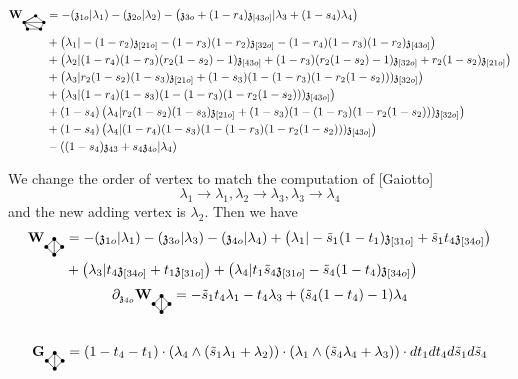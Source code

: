 \documentclass[11pt]{amsart}
\newcommand{\bgraphW}{
  \mathbf{W}_{\tikz[baseline=-0.5ex]{
      \coordinate (A) at (0,0);
      \coordinate (B) at (4mm,0);
      \coordinate (C) at (5mm,2mm);
      \coordinate (D) at (2.5mm,4mm);
      \coordinate (E) at (-1mm,2mm);

      \fill (A) circle (0.5mm);
      \fill (B) circle (0.5mm);
      \fill (C) circle (0.5mm);
      \fill (D) circle (0.5mm);
      \fill (E) circle (0.5mm);

      \draw (A) -- (B);
      \draw (B) -- (C);
      \draw (C) -- (D);
      \draw (D) -- (E);
      \draw (E) -- (A);

      \draw (E) -- (A);
      \draw (E) -- (B);
      \draw (E) -- (C);
      \draw (E) -- (D);
  }}
}
\newcommand{\agraphG}{
  \mathbf{G}_{\tikz[baseline=-0.5ex]{
      \coordinate (A) at (0,0);
      \coordinate (B) at (4mm,0);
      \coordinate (C) at (2mm,2mm);
      \coordinate (D) at (2mm,-2mm);

      \fill (A) circle (0.5mm);
      \fill (B) circle (0.5mm);
      \fill (C) circle (0.5mm);
      \fill (D) circle (0.5mm);

      \draw (A) -- (C);
      \draw (A) -- (D);
      \draw (C) -- (D);
      \draw (B) -- (C);
      \draw (B) -- (D);
  }}
}
\newcommand{\agraphW}{
  \mathbf{W}_{\tikz[baseline=-0.5ex]{
      \coordinate (A) at (0,0);
      \coordinate (B) at (4mm,0);
      \coordinate (C) at (2mm,2mm);
      \coordinate (D) at (2mm,-2mm);

      \fill (A) circle (0.5mm);
      \fill (B) circle (0.5mm);
      \fill (C) circle (0.5mm);
      \fill (D) circle (0.5mm);

      \draw (A) -- (C);
      \draw (A) -- (D);
      \draw (C) -- (D);
      \draw (B) -- (C);
      \draw (B) -- (D);
  }}
}
\theoremstyle{definition}
\theoremstyle{remark}
\numberwithin{equation}{section}
\begin{document}
\iffalse
  \begin{align*}
        \bgraphW&=-(\mathfrak{z}_{1o}|\lambda_1)-(\mathfrak{z}_{2o}|\lambda_2)-\left(\mathfrak{z}_{3o}+(1-r_4)\mathfrak{z}_{[43o]}|\lambda_{3}+(1-s_4)\lambda_4\right)\\
        &+\left(\lambda_1|-(1-r_{2})\mathfrak{z}_{[2 1o]}-(1-r_3)(1-r_2)\mathfrak{z}_{[32o]}-(1-r_4)(1-r_3)(1-r_2)\mathfrak{z}_{[43o]}\right)\\
&+\left(\lambda_2|(1-r_4)(1-r_{3})(r_2(1-s_2)-1)\mathfrak{z}_{[43o]}+(1-r_{3})(r_2(1-s_2)-1)\mathfrak{z}_{[3 2o]}+r_2(1-s_2)\mathfrak{z}_{[2 1o]}\right)\\
&+\left(\lambda_3|r_2(1-s_2)(1-s_3)\mathfrak{z}_{[21o]}+(1-s_3)(1-(1-r_3)(1-r_2(1-s_2)))\mathfrak{z}_{[32o]}\right)\\
&+\left(\lambda_3|(1-r_4)(1-s_3)(1-(1-r_3)(1-r_2(1-s_2)))\mathfrak{z}_{[43o]}\right)\\
&+(1-s_4)\left(\lambda_4|r_2(1-s_2)(1-s_3)\mathfrak{z}_{[21o]}+(1-s_3)(1-(1-r_3)(1-r_2(1-s_2)))\mathfrak{z}_{[32o]}\right)\\
&+(1-s_4)\left(\lambda_4|(1-r_4)(1-s_3)(1-(1-r_3)(1-r_2(1-s_2)))\mathfrak{z}_{[43o]}\right)\\
&-\left((1-s_4)\mathfrak{z}_{43}+s_4\mathfrak{z}_{4o}|\lambda_4\right)
  \end{align*}

  We change the order of vertex to match the computation of [Gaiotto]
  $$
  \lambda_1\rightarrow\lambda_1,\lambda_2\rightarrow \lambda_3, \lambda_3\rightarrow \lambda_4
  $$
  and the new adding vertex is $\lambda_2$. Then we have
  \begin{align*}
      \agraphW &=-(\mathfrak{z}_{1o}|\lambda_1)-(\mathfrak{z}_{3o}|\lambda_3)-\left(\mathfrak{z}_{4o}|\lambda_{4}\right)+\left(\lambda_1|-\tilde{s}_1(1-t_1)\mathfrak{z}_{[3 1o]}+\tilde{s}_1t_4\mathfrak{z}_{[34o]}\right)\\
&+\left(\lambda_3|t_4\mathfrak{z}_{[34o]}+t_1\mathfrak{z}_{[3 1o]}\right)+\left(\lambda_4|t_1\tilde{s}_4\mathfrak{z}_{[31o]}-\tilde{s}_4(1-t_4)\mathfrak{z}_{[34o]}\right)\\
\end{align*}
$$
\partial_{\mathfrak{z}_{4o}}\agraphW=-\tilde{s}_1t_4\lambda_1-t_4\lambda_3+(\tilde{s}_4(1-t_4)-1)\lambda
_4
$$
  \begin{align*}
     &  \\
     \agraphG& =(1-t_4-t_1)\cdot(\lambda_4\wedge(\tilde{s}_1\lambda_1+\lambda_2))\cdot (\lambda_1\wedge(\tilde{s}_4\lambda_4+\lambda_3)) \cdot dt_1dt_4d\tilde{s}_1d\tilde{s}_4
  \end{align*}
\end{document}

